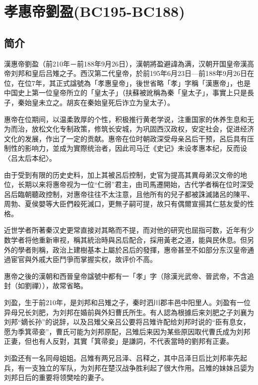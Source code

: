 
\section{孝惠帝劉盈\tiny(BC195-BC188)}

\subsection{简介}

漢惠帝劉盈（前210年－前188年9月26日），漢朝將盈避諱為满，汉朝开国皇帝漢高帝刘邦和皇后吕雉之子。西汉第二代皇帝，於前195年6月23日—前188年9月26日在位，在位7年，其正式諡號為「孝惠皇帝」，後世省略「孝」字稱「漢惠帝」，也是中国史上第一位皇帝所立的「皇太子」（扶蘇被訛稱為秦「皇太子」，事實上只是長子，秦始皇未立之。胡亥在秦始皇死后诈立为皇太子）。

惠帝在位期间，以温柔敦厚的个性，积极推行黄老学说，注重国家的休养生息和无为而治，放松文化专制政策，修筑长安城，为巩固西汉政权，安定社会，促进经济文化的发展，作出了一定的贡献。惠帝在位时朝政深受母亲呂后干预，呂后具有压制性的影响力，並成为實際统治者，因此司马迁《史记》未设孝惠本纪，反而设〈吕太后本纪〉。

由于受到有限的历史史料，加上其被呂后控制，史官为提高其異母弟汉文帝的地位，长期以来将惠帝视为一位“仁弱”君主，由司馬遷開始，古代学者稱在位时深受呂后臨朝聽政控制，对惠帝往往不太注意，且他所有的兒子都被誅滅諸呂的陳平、周勃、夏侯嬰等大臣們殺死滅口，更無子嗣可提，故只有偶爾宣揚其仁慈友愛的性格。

近世学者所著秦汉史更常直接对其略而不提，而对他的研究也屈指可数，近年有少数学者将他重新审视，稱其統治時與呂后配合，採用黃老之道，能與民休息。但另外的學者則稱，政治上建樹基本上屬於呂后的發揮，惠帝甚至不如部分东汉皇帝通過宦官與外戚大臣鬥爭而掌握实权，故评价不高。

惠帝之後的漢朝和西晉皇帝諡號中都有一「孝」字（除漢光武帝、晉武帝，不含追封（如劉禪）），故常省略。

刘盈，生于前210年，是刘邦和吕雉之子，秦时泗川郡丰邑中阳里人。刘盈有一位异母兄长刘肥，为刘邦在婚前與外妇曹氏所生。有人認為根據后来刘肥之子刘襄为刘邦“嫡长孙”的说辞，以及吕雉父亲吕公要将吕雉许配给刘邦时说的“臣有息女，愿为季箕帚妾”，曹氏可能为刘邦原配，吕雉后来因为某些原因取代曹氏成为刘邦正妻，但也有人反對，其實「箕帚妾」是謙詞，不代表當時的劉邦有正妻。

刘盈还有一名同母姐姐。吕雉有两兄吕泽、吕释之，其中吕泽日后比刘邦率先起兵，有一支独立的军队，为刘邦在楚汉战争胜利起了很大作用。吕雉的妹妹吕媭为刘邦日后的重要将领樊哙的妻子。

